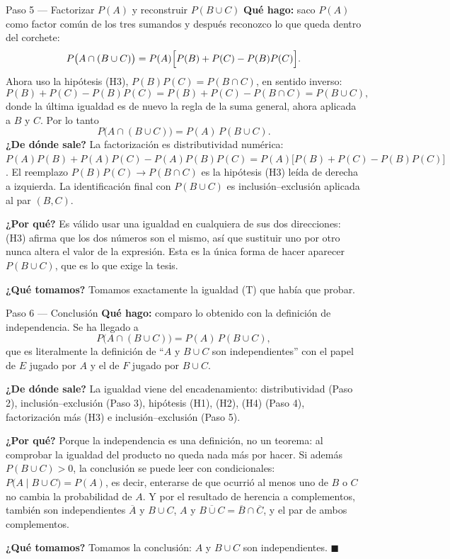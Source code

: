 \documentclass[11pt]{article}
\begin{document}
\begin{sol}
\begin{paso}{Paso 5 --- Factorizar $P(A)$ y reconstruir $P(B\cup C)$}
\textbf{Qué hago:} saco $P(A)$ como factor común de los tres sumandos y después reconozco lo
que queda dentro del corchete:
\[
P\bigl(A\cap(B\cup C)\bigr)=P(A)\Bigl[P(B)+P(C)-P(B)P(C)\Bigr].
\]
Ahora uso la hipótesis (H3), $P(B)P(C)=P(B\cap C)$, en sentido inverso:
\[
P(B)+P(C)-P(B)P(C)=P(B)+P(C)-P(B\cap C)=P(B\cup C),
\]
donde la última igualdad es de nuevo la regla de la suma general, ahora aplicada a $B$ y $C$.
Por lo tanto
\[
P\bigl(A\cap(B\cup C)\bigr)=P(A)\,P(B\cup C).
\]
\textbf{¿De dónde sale?} La factorización es distributividad numérica:
$P(A)P(B)+P(A)P(C)-P(A)P(B)P(C)=P(A)\bigl[P(B)+P(C)-P(B)P(C)\bigr]$. El reemplazo
$P(B)P(C)\to P(B\cap C)$ es la hipótesis (H3) leída de derecha a izquierda. La identificación
final con $P(B\cup C)$ es inclusión--exclusión aplicada al par $(B,C)$.

\textbf{¿Por qué?} Es válido usar una igualdad en cualquiera de sus dos direcciones: (H3)
afirma que los dos números son el mismo, así que sustituir uno por otro nunca altera el valor
de la expresión. Esta es la única forma de hacer aparecer $P(B\cup C)$, que es lo que exige la
tesis.

\textbf{¿Qué tomamos?} Tomamos exactamente la igualdad (T) que había que probar.
\end{paso}

\begin{paso}{Paso 6 --- Conclusión}
\textbf{Qué hago:} comparo lo obtenido con la definición de independencia. Se ha llegado a
\[
P\bigl(A\cap(B\cup C)\bigr)=P(A)\,P(B\cup C),
\]
que es literalmente la definición de ``$A$ y $B\cup C$ son independientes'' con el papel de
$E$ jugado por $A$ y el de $F$ jugado por $B\cup C$.

\textbf{¿De dónde sale?} La igualdad viene del encadenamiento: distributividad (Paso 2),
inclusión--exclusión (Paso 3), hipótesis (H1), (H2), (H4) (Paso 4), factorización más (H3) e
inclusión--exclusión (Paso 5).

\textbf{¿Por qué?} Porque la independencia es una definición, no un teorema: al comprobar la
igualdad del producto no queda nada más por hacer. Si además $P(B\cup C)>0$, la conclusión se
puede leer con condicionales: $P\bigl(A\mid B\cup C\bigr)=P(A)$, es decir, enterarse de que
ocurrió al menos uno de $B$ o $C$ no cambia la probabilidad de $A$. Y por el resultado de
herencia a complementos, también son independientes $\overline{A}$ y $B\cup C$, $A$ y
$\overline{B\cup C}=\overline{B}\cap\overline{C}$, y el par de ambos complementos.

\textbf{¿Qué tomamos?} Tomamos la conclusión: $A$ y $B\cup C$ son independientes.
$\blacksquare$
\end{paso}
\end{sol}
\end{document}
